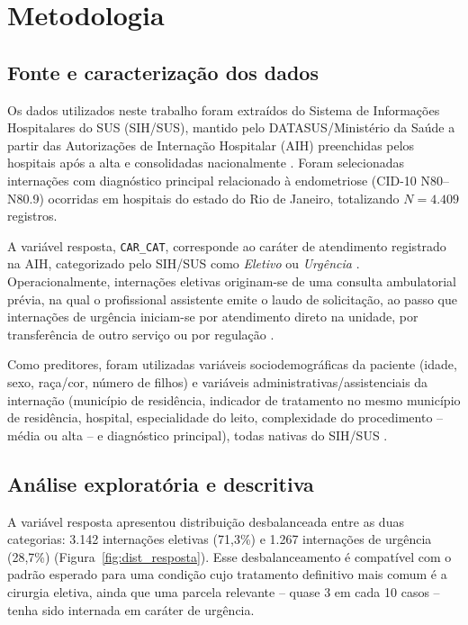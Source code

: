 \documentclass[12pt,a4paper]{article}
\begin{document}
\section{Metodologia}

\subsection{Fonte e caracterização dos dados}

Os dados utilizados neste trabalho foram extraídos do Sistema de Informações Hospitalares do SUS (SIH/SUS), mantido pelo DATASUS/Ministério da Saúde a partir das Autorizações de Internação Hospitalar (AIH) preenchidas pelos hospitais após a alta e consolidadas nacionalmente \cite{datasus_sih}. Foram selecionadas internações com diagnóstico principal relacionado à endometriose (CID-10 N80--N80.9) ocorridas em hospitais do estado do Rio de Janeiro, totalizando $N = 4.409$ registros.

A variável resposta, \texttt{CAR\_CAT}, corresponde ao caráter de atendimento registrado na AIH, categorizado pelo SIH/SUS como \emph{Eletivo} ou \emph{Urgência} \cite{sihsus_rj}. Operacionalmente, internações eletivas originam-se de uma consulta ambulatorial prévia, na qual o profissional assistente emite o laudo de solicitação, ao passo que internações de urgência iniciam-se por atendimento direto na unidade, por transferência de outro serviço ou por regulação \cite{sihsus_rj}.

Como preditores, foram utilizadas variáveis sociodemográficas da paciente (idade, sexo, raça/cor, número de filhos) e variáveis administrativas/assistenciais da internação (município de residência, indicador de tratamento no mesmo município de residência, hospital, especialidade do leito, complexidade do procedimento -- média ou alta -- e diagnóstico principal), todas nativas do SIH/SUS \cite{datasus_sih,sihsus_rj}.

\subsection{Análise exploratória e descritiva}
\label{sec:analise_descritiva}

A variável resposta apresentou distribuição desbalanceada entre as duas categorias: 3.142 internações eletivas (71,3\%) e 1.267 internações de urgência (28,7\%) (Figura~\ref{fig:dist_resposta}). Esse desbalanceamento é compatível com o padrão esperado para uma condição cujo tratamento definitivo mais comum é a cirurgia eletiva, ainda que uma parcela relevante -- quase 3 em cada 10 casos -- tenha sido internada em caráter de urgência.
\end{document}
